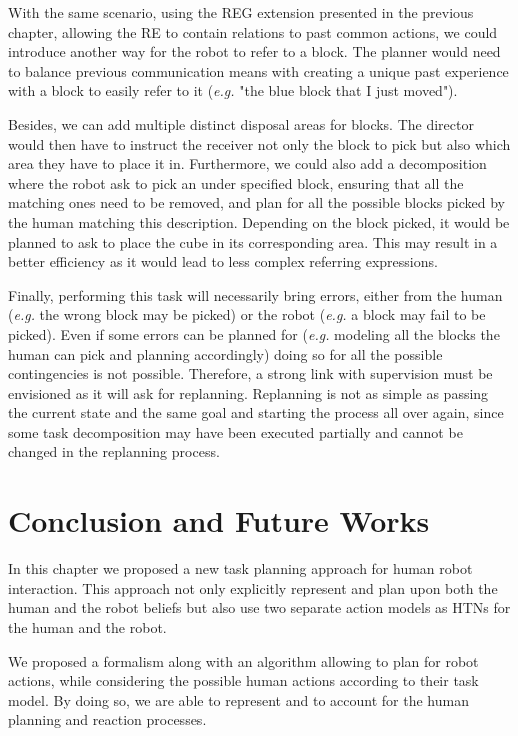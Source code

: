\documentclass[a4paper,11pt,twoside]{StyleThese}
\begin{document}
With the same scenario, using the REG extension presented in the previous chapter, allowing the RE to contain relations to past common actions, we could introduce another way for the robot to refer to a block. The planner would need to balance previous communication means with creating a unique past experience with a block to easily refer to it (\textit{e.g.} "the blue block that I just moved").

Besides, we can add multiple distinct disposal areas for blocks. The director would then have to instruct the receiver not only the block to pick but also which area they have to place it in. Furthermore, we could also add a decomposition where the robot ask to pick an under specified block, ensuring that all the matching ones need to be removed, and plan for all the possible blocks picked by the human matching this description. Depending on the block picked, it would be planned to ask to place the cube in its corresponding area. This may result in a better efficiency as it would lead to less complex referring expressions.

Finally, performing this task will necessarily bring errors, either from the human (\textit{e.g.} the wrong block may be picked) or the robot (\textit{e.g.} a block may fail to be picked). Even if some errors can be planned for (\textit{e.g.} modeling all the blocks the human can pick and planning accordingly) doing so for all the possible contingencies is not possible. Therefore, a strong link with supervision must be envisioned as it will ask for replanning. Replanning is not as simple as passing the current state and the same goal and starting the process all over again, since some task decomposition may have been executed partially and cannot be changed in the replanning process.


\section{Conclusion and Future Works}
In this chapter we proposed a new task planning approach for human robot interaction. This approach not only explicitly represent and plan upon both the human and the robot beliefs but also use two separate action models as HTNs for the human and the robot.

We proposed a formalism along with an algorithm allowing to plan for robot actions, while considering the possible human actions according to their task model. By doing so, we are able to represent and to account for the human planning and reaction processes.
\end{document}
